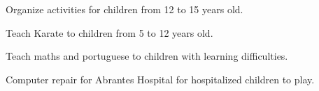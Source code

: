 \documentclass[10pt,a4paper,ragged2e,withhyper]{altacv}
\begin{document}
\begin{paracol}{2}

\small Organize activities for children from 12 to 15 years old.

\divider

\small Teach Karate to children from 5 to 12 years old.

\divider

\small Teach maths and portuguese to children with learning difficulties.

\divider

\small Computer repair for Abrantes Hospital for hospitalized children to play.



\end{paracol}
\end{document}
